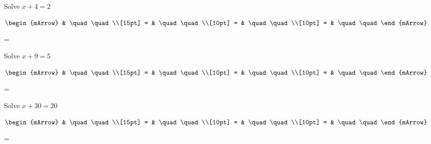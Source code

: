\clearpage
\begin{mtask}[resume]
   \task \begin{exercise} Solve $ x + 4 = 2 $
           \begin{envSolution}
             $\begin{mArrow} 
			       & \quad \quad              \\[15pt]
                 = & \quad \quad              \\[10pt]
		   		 = & \quad \quad              \\[10pt]
				 = & \quad \quad 
              \end{mArrow}$
            \begin{shortsolution}  
			     =$ \quad \quad \quad \quad$
			\end{shortsolution}				 
           \end{envSolution}
         \end{exercise}
   \task \begin{exercise} Solve $ x + 9 = 5 $
           \begin{envSolution}
             $\begin{mArrow} 
			       & \quad \quad              \\[15pt]
                 = & \quad \quad              \\[10pt]
		   		 = & \quad \quad              \\[10pt]
				 = & \quad \quad 
              \end{mArrow}$
            \begin{shortsolution}  
			     =$ \quad \quad \quad \quad$
			\end{shortsolution}				 
           \end{envSolution}
         \end{exercise}
   \task \begin{exercise} Solve $ x + 30 = 20 $
           \begin{envSolution}
             $\begin{mArrow} 
			       & \quad \quad              \\[15pt]
                 = & \quad \quad              \\[10pt]
		   		 = & \quad \quad              \\[10pt]
				 = & \quad \quad 
              \end{mArrow}$
            \begin{shortsolution}  
			     =$ \quad \quad \quad \quad$
			\end{shortsolution}				 
           \end{envSolution}
         \end{exercise}
\end{mtask}

